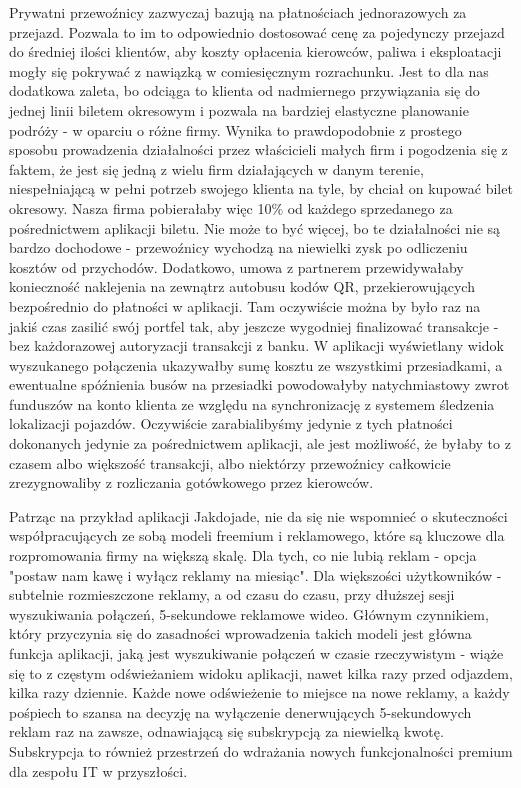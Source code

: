 Prywatni przewoźnicy zazwyczaj bazują na płatnościach jednorazowych za przejazd. Pozwala to im to odpowiednio dostosować cenę za pojedynczy przejazd do średniej ilości klientów, aby koszty opłacenia kierowców, paliwa i eksploatacji mogły się pokrywać z nawiązką w comiesięcznym rozrachunku. Jest to dla nas dodatkowa zaleta, bo odciąga to klienta od nadmiernego przywiązania się do jednej linii biletem okresowym i pozwala na bardziej elastyczne planowanie podróży - w oparciu o różne firmy. Wynika to prawdopodobnie z prostego sposobu prowadzenia działalności przez właścicieli małych firm i pogodzenia się z faktem, że jest się jedną z wielu firm działających w danym terenie, niespełniającą w pełni potrzeb swojego klienta na tyle, by chciał on kupować bilet okresowy. Nasza firma pobierałaby więc 10\% od każdego sprzedanego za pośrednictwem aplikacji biletu. Nie może to być więcej, bo te działalności nie są bardzo dochodowe - przewoźnicy wychodzą na niewielki zysk po odliczeniu kosztów od przychodów. Dodatkowo, umowa z partnerem przewidywałaby konieczność naklejenia na zewnątrz autobusu kodów QR, przekierowujących bezpośrednio do płatności w aplikacji. Tam oczywiście można by było raz na jakiś czas zasilić swój portfel tak, aby jeszcze wygodniej finalizować transakcje - bez każdorazowej autoryzacji transakcji z banku. W aplikacji wyświetlany widok wyszukanego połączenia ukazywałby sumę kosztu ze wszystkimi przesiadkami, a ewentualne spóźnienia busów na przesiadki powodowałyby natychmiastowy zwrot funduszów na konto klienta ze względu na synchronizację z systemem śledzenia lokalizacji pojazdów. Oczywiście zarabialibyśmy jedynie z tych płatności dokonanych jedynie za pośrednictwem aplikacji, ale jest możliwość, że byłaby to z czasem albo większość transakcji, albo niektórzy przewoźnicy całkowicie zrezygnowaliby z rozliczania gotówkowego przez kierowców.

    
Patrząc na przykład aplikacji Jakdojade, nie da się nie wspomnieć o skuteczności współpracujących ze sobą modeli freemium i reklamowego, które są kluczowe dla rozpromowania firmy na większą skalę. Dla tych, co nie lubią reklam - opcja "postaw nam kawę i wyłącz reklamy na miesiąc". Dla większości użytkowników - subtelnie rozmieszczone reklamy, a od czasu do czasu, przy dłuższej sesji wyszukiwania połączeń, 5-sekundowe reklamowe wideo. Głównym czynnikiem, który przyczynia się do zasadności wprowadzenia takich modeli jest główna funkcja aplikacji, jaką jest wyszukiwanie połączeń w czasie rzeczywistym - wiąże się to z częstym odświeżaniem widoku aplikacji, nawet kilka razy przed odjazdem, kilka razy dziennie. Każde nowe odświeżenie to miejsce na nowe reklamy, a każdy pośpiech to szansa na decyzję na wyłączenie denerwujących 5-sekundowych reklam raz na zawsze, odnawiającą się subskrypcją za niewielką kwotę. Subskrypcja to również przestrzeń do wdrażania nowych funkcjonalności premium dla zespołu IT w przyszłości.



